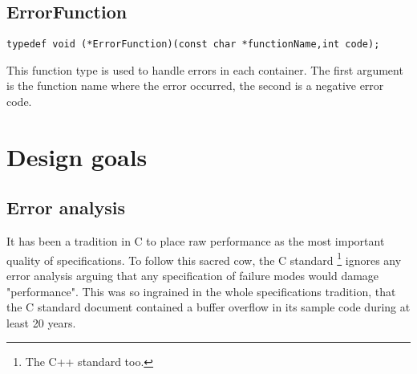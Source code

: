 \documentclass[12pt,a4paper]{memoir} %
\begin{document}
\subsection{ErrorFunction}
\begin{verbatim}
typedef void (*ErrorFunction)(const char *functionName,int code);
\end{verbatim}
This function type is used to handle errors in each container. The first argument is the function name where the error occurred, the second is a negative error code.
%
%
\section{Design goals}
\subsection{Error analysis}
It has been a  tradition in C to place raw performance as the most important quality of specifications. To follow this sacred cow, the C standard
\footnote{The C++ standard too.} ignores any error analysis arguing that any specification of failure modes would damage "performance". This was
so ingrained in the whole specifications tradition, that the C standard document contained a buffer overflow in its sample code during at 
least 20 years.
\end{document}
